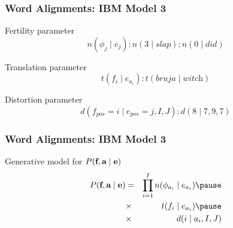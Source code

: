 \begin{frame}
\frametitle{Word Alignments: IBM Model 3}
\begin{block}{Fertility parameter}
\[ n(\phi_j \mid e_j) : n(3 \mid \textit{slap}) ; n(0 \mid \textit{did}) \]
\end{block}\pause
\begin{block}{Translation parameter}
\[ t(f_i \mid e_{a_i}) : t(\textit{bruja} \mid \textit{witch}) \]
\end{block}\pause
\begin{block}{Distortion parameter}
\[ d(f_{\textit{pos}} = i \mid e_{\textit{pos}} = j, I, J) : d(8 \mid 7, 9, 7) \]
\end{block}
\end{frame}

\begin{frame}
\frametitle{Word Alignments: IBM Model 3}
\begin{block}{Generative model for $P(\textbf{f}, \textbf{a} \mid \textbf{e})$}
\begin{eqnarray*}
P(\src, \aln \mid \tgt) & = & \prod_{i=1}^I n(\phi_{a_i} \mid e_{a_i})  \pause\\
& \times & t(f_i \mid e_{a_i}) \pause\\
& \times & d(i \mid a_i, I, J)
\end{eqnarray*}
\end{block}
\end{frame}

